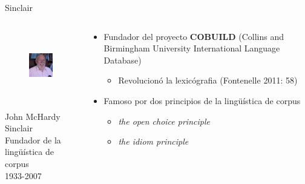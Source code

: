 \documentclass{beamer}
\begin{document}
\begin{frame}{Sinclair}
	\begin{columns}
    	\begin{column}{6cm}
        	\begin{figure}
    		\includegraphics[height=3cm]{sinclair.jpg}
       		\end{figure}
            \begin{center}
			\begin{tiny}
            John McHardy Sinclair \\
			Fundador de la lingüística de corpus \\
			1933-2007\\
            \end{tiny}
			\end{center}
        \end{column}
        \begin{column}{6cm}
        	\begin{itemize}
            	\pause
                \item Fundador del proyecto \textbf{COBUILD} (Collins and Birmingham University International Language Database)
                \begin{itemize}
                	\pause
                    \item Revolucionó la lexicógrafia (Fontenelle 2011: 58)
                \end{itemize}
                \pause
                \item Famoso por dos principios de la lingüística de corpus
                \begin{itemize}
                	\pause
                    \item \textit{the open choice principle}
                    \item \textit{the idiom principle}
                \end{itemize}
            \end{itemize}
        \end{column}
    \end{columns}
\end{frame}
\end{document}
